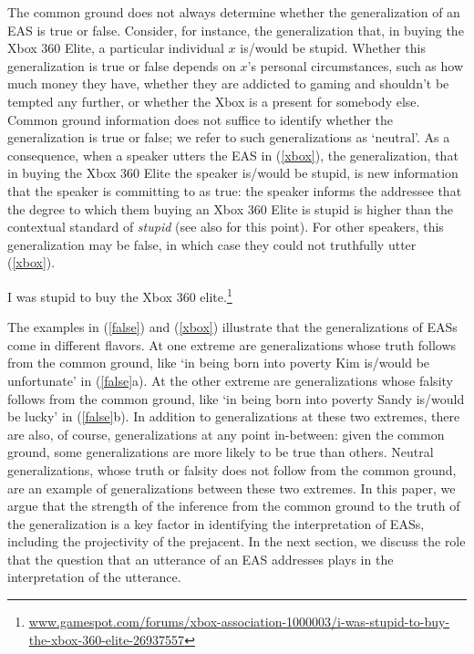 \documentclass[11pt,fleqn]{article}
\newcommand{\6}{\mbox{$[\hspace*{-.6mm}[$}}
\newcommand{\9}{\mbox{$]\hspace*{-.6mm}]$}}
\begin{document}
The common ground does not always determine whether the generalization of an EAS is true or false. Consider, for instance, the generalization that, in buying the Xbox 360 Elite, a particular individual $x$ is/would be stupid. Whether this generalization is true or false depends on $x$'s personal circumstances, such as how much money they have, whether they are addicted to gaming and shouldn't be tempted any further, or whether the Xbox is a present for somebody else. Common ground information does not suffice to identify whether the generalization is true or false; we refer to such generalizations as `neutral'. As a consequence, when a speaker utters the EAS in (\ref{xbox}), the generalization, that in buying the Xbox 360 Elite the speaker is/would be stupid, is new information that the speaker is committing to as true: the speaker informs the addressee that the degree to which them buying an Xbox 360 Elite is stupid is higher than the contextual standard of {\em stupid} (see also \citealt{barker02} for this point). For other speakers, this generalization may be false, in which case they could not truthfully utter (\ref{xbox}).

\begin{exe}
\ex\label{xbox} I was stupid to buy the Xbox 360 elite.\footnote{\url{www.gamespot.com/forums/xbox-association-1000003/i-was-stupid-to-buy-the-xbox-360-elite-26937557}}
\end{exe}

The examples in (\ref{false}) and (\ref{xbox}) illustrate that the generalizations of EASs come in different flavors. At one extreme are generalizations whose truth follows from the common ground, like `in being born into poverty Kim is/would be unfortunate' in (\ref{false}a). At the other extreme are generalizations whose falsity follows from the common ground, like `in being born into poverty Sandy is/would be lucky' in (\ref{false}b). In addition to generalizations at these two extremes, there are also, of course, generalizations at any point in-between: given the common ground, some generalizations are more likely to be true than others. Neutral generalizations, whose truth or falsity does not follow from the common ground, are an example of generalizations between these two extremes. In this paper, we argue that the strength of the inference from the common ground to the truth of the generalization is a key factor in identifying the interpretation of EASs, including the projectivity of the prejacent. In the next section, we discuss the role that the question that an utterance of an EAS addresses plays in the interpretation of the utterance.
\end{document}
